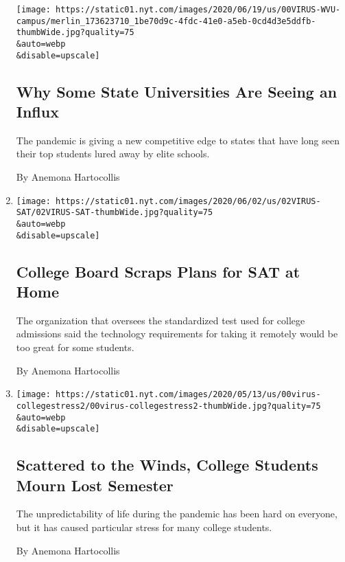 \begin{enumerate}
  \texttt{[image: https://static01.nyt.com/images/2020/06/19/us/00VIRUS-WVU-campus/merlin\_173623710\_1be70d9c-4fdc-41e0-a5eb-0cd4d3e5ddfb-thumbWide.jpg?quality=75\\\&auto=webp\\\&disable=upscale]}

  \hypertarget{why-some-state-universities-are-seeing-an-influx}{%
  \subsection{Why Some State Universities Are Seeing an
  Influx}\label{why-some-state-universities-are-seeing-an-influx}}

  The pandemic is giving a new competitive edge to states that have long
  seen their top students lured away by elite schools.

  By Anemona Hartocollis
\item
  \href{/2020/06/02/us/at-home-sat-coronavirus.html}{}

  \texttt{[image: https://static01.nyt.com/images/2020/06/02/us/02VIRUS-SAT/02VIRUS-SAT-thumbWide.jpg?quality=75\\\&auto=webp\\\&disable=upscale]}

  \hypertarget{college-board-scraps-plans-for-sat-at-home}{%
  \subsection{College Board Scraps Plans for SAT at
  Home}\label{college-board-scraps-plans-for-sat-at-home}}

  The organization that oversees the standardized test used for college
  admissions said the technology requirements for taking it remotely
  would be too great for some students.

  By Anemona Hartocollis
\item
  \href{/2020/05/27/us/coronavirus-college-mental-health.html}{}

  \texttt{[image: https://static01.nyt.com/images/2020/05/13/us/00virus-collegestress2/00virus-collegestress2-thumbWide.jpg?quality=75\\\&auto=webp\\\&disable=upscale]}

  \hypertarget{scattered-to-the-winds-college-students-mourn-lost-semester}{%
  \subsection{Scattered to the Winds, College Students Mourn Lost
  Semester}\label{scattered-to-the-winds-college-students-mourn-lost-semester}}

  The unpredictability of life during the pandemic has been hard on
  everyone, but it has caused particular stress for many college
  students.

  By Anemona Hartocollis
\end{enumerate}

